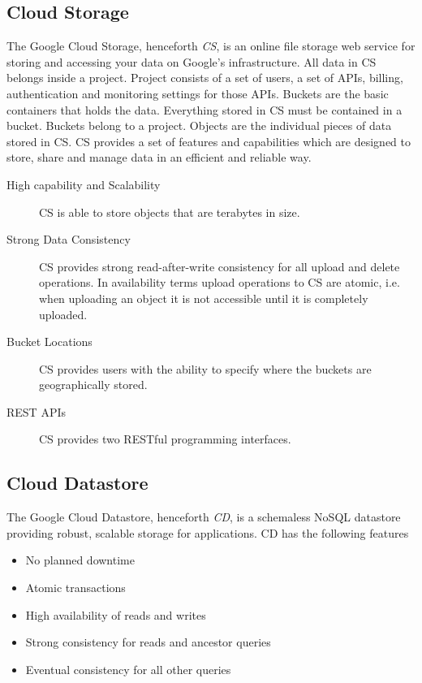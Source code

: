 \documentclass[11pt]{report}
\begin{document}
\subsection{Cloud Storage}
The Google Cloud Storage, henceforth \emph{CS}, is an online file storage web service for storing and accessing your data on Google's infrastructure. All data in CS belongs inside a project. Project consists of a set of users, a set of APIs, billing, authentication and monitoring settings for those APIs. Buckets are the basic containers that holds the data. Everything stored in CS must be contained in a bucket. Buckets belong to a project. Objects are the individual pieces of data stored in CS. CS provides a set of features and capabilities which are designed to store, share and manage data in an efficient and reliable way.

\begin{description}
\item[High capability and Scalability] CS is able to store objects that are terabytes in size.
\item[Strong Data Consistency] CS provides strong read-after-write consistency for all upload and delete operations. In availability terms upload operations to CS are atomic, i.e. when uploading an object it is not accessible until it is completely uploaded.
\item[Bucket Locations] CS provides users with the ability to specify where the buckets are geographically stored.
\item[REST APIs] CS provides two RESTful programming interfaces.
\end{description}

\subsection{Cloud Datastore}
The Google Cloud Datastore, henceforth \emph{CD}, is a schemaless NoSQL datastore providing robust, scalable storage for applications. CD has the following features

\begin{itemize}
\item No planned downtime
\item Atomic transactions
\item High availability of reads and writes
\item Strong consistency for reads and ancestor queries
\item Eventual consistency for all other queries
\end{itemize}
\end{document}
